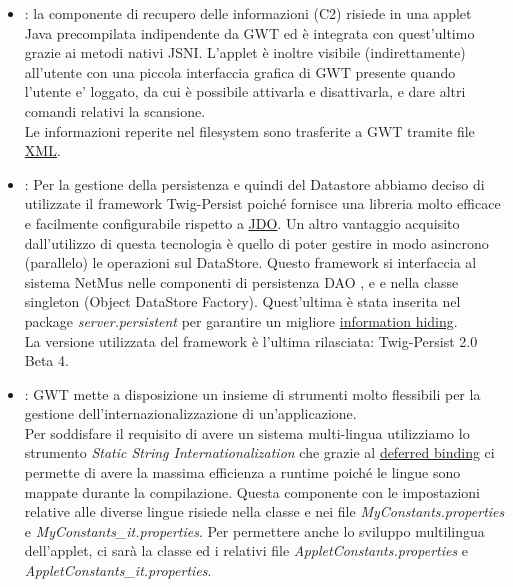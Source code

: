 \begin{itemize}
  \item {} : la componente di recupero delle informazioni (C2) risiede
  in una applet\\Java precompilata indipendente da GWT ed \`e integrata con
  quest'ultimo grazie ai metodi nativi JSNI. L'applet \`e inoltre visibile
  (indirettamente) all'utente con una piccola interfaccia grafica di GWT
  presente quando l'utente e' loggato, da cui \`e possibile
  attivarla e disattivarla, e dare altri comandi relativi la scansione.\\ Le
  informazioni reperite nel filesystem sono trasferite a GWT tramite file
  \underline{XML}.
  
  \item {} : Per la gestione della persistenza e
  quindi del Datastore abbiamo deciso di utilizzate il framework Twig-Persist poich\'e
  fornisce una libreria molto efficace e facilmente configurabile
  rispetto a \underline{JDO}. Un altro vantaggio acquisito dall'utilizzo di
  questa tecnologia \`e quello di poter gestire in modo asincrono (parallelo) le
  operazioni sul DataStore. Questo framework si interfaccia al sistema NetMus
  nelle componenti di persistenza DAO ,  e
   e nella classe singleton  (Object DataStore
  Factory). Quest'ultima \`e stata inserita nel package \emph{server.persistent}
  per garantire un migliore \underline{information hiding}. \\
  La versione utilizzata del framework \`e l'ultima rilasciata: Twig-Persist 2.0
  Beta 4.
  
  \item {} : GWT mette a disposizione un insieme di
  strumenti molto flessibili per la gestione dell'internazionalizzazione di
  un'applicazione.\\ Per soddisfare il requisito di avere un sistema
  multi-lingua utilizziamo lo strumento \emph{Static String
  Internationalization} che grazie al \underline{deferred binding} ci permette
  di avere la massima efficienza a runtime poich\'e le lingue sono mappate durante la
  compilazione. Questa componente con le impostazioni relative alle
  diverse lingue risiede nella classe  e nei file
  \emph{MyConstants.properties} e \emph{MyConstants\_it.properties}. Per
  permettere anche lo sviluppo multilingua dell'applet, ci sar\`a la classe
   ed i relativi file \emph{AppletConstants.properties} e
  \emph{AppletConstants\_it.properties}.
\end{itemize}

